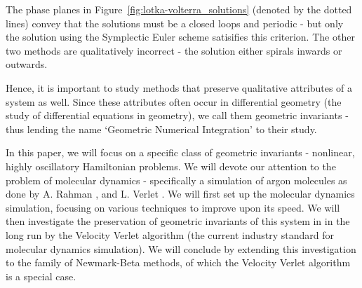 \documentclass[../Main.tex]{subfiles}
\begin{document}
The phase planes in Figure~\ref{fig:lotka-volterra_solutions} (denoted by the dotted lines) convey that the solutions must be a closed loops and periodic - but only the solution using the Symplectic Euler scheme satisifies this criterion. The other two methods are qualitatively incorrect - the solution either spirals inwards or outwards.

Hence, it is important to study methods that preserve qualitative attributes of a system as well. Since these attributes often occur in differential geometry (the study of differential equations in geometry), we call them geometric invariants - thus lending the name `Geometric Numerical Integration' to their study.

In this paper, we will focus on a specific class of geometric invariants - nonlinear, highly oscillatory Hamiltonian problems. We will devote our attention to the problem of molecular dynamics - specifically a simulation of argon molecules as done by A. Rahman \cite{Rahman1964}, and L. Verlet \cite{Verlet1967}. We will first set up the molecular dynamics simulation, focusing on various techniques to improve upon its speed. We will then investigate the preservation of geometric invariants of this system in in the long run by the Velocity Verlet algorithm (the current industry standard for molecular dynamics simulation). We will conclude by extending this investigation to the family of Newmark-Beta methods, of which the Velocity Verlet algorithm is a special case.
\end{document}

